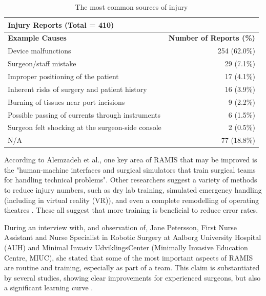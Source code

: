 \documentclass[conference]{IEEEtran}
\begin{document}
\begin{table}[H]
\centering
\begin{tabular}{@{}lr@{}}
\toprule
\multicolumn{2}{l}{\textbf{Injury Reports (Total = 410)}}                           \\ \midrule
\textbf{Example Causes}                           & \textbf{Number of Reports (\%)} \\ \midrule
Device malfunctions                               & 254 (62.0\%)                    \\
Surgeon/staff mistake                             & 29 (7.1\%)                      \\
Improper positioning of the patient               & 17 (4.1\%)                      \\
Inherent risks of surgery and patient history     & 16 (3.9\%)                      \\
Burning of tissues near port incisions            & 9 (2.2\%)                       \\
Possible passing of currents through instruments           & 6 (1.5\%)                       \\
Surgeon felt shocking at the surgeon-side console & 2 (0.5\%)                       \\
N/A                                               & 77 (18.8\%)                     \\ \toprule
\end{tabular}
\caption{The most common sources of injury \citep{alemzadeh_adverse_2016}}
\label{tab:Alam}
\end{table}

According to Alemzadeh et al., one key area of RAMIS that may be improved is the "human-machine interfaces and surgical simulators that train surgical teams for handling technical problems". Other researchers suggest a variety of methods to reduce injury numbers, such as dry lab training, simulated emergency handling (including in virtual reality (VR)), and even a complete remodelling of operating theatres \citep{liberman_training_2011, huser_simulated_2014, ahmad_ambulatory_2016, abelson_virtual_2015}. These all suggest that more training is beneficial to reduce error rates.

During an interview with, and observation of, Jane Petersson, First Nurse Assistant and Nurse Specialist in Robotic Surgery at Aalborg University Hospital (AUH) and Minimal Invasiv UdviklingsCenter (Minimally Invasive Education Centre, MIUC), she stated that some of the most important aspects of RAMIS are routine and training, especially as part of a team. This claim is substantiated by several studies, showing clear improvements for experienced surgeons, but also a significant learning curve \citep{moorthy_human_2005,chandra_comparison_2010}.
\end{document}
